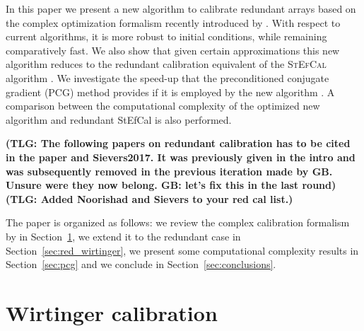 \documentclass[useAMS,usenatbib]{mn2e}
\begin{document}
In this paper we present a new algorithm to calibrate redundant arrays based on the complex optimization formalism recently introduced by \cite{Smirnov2015}. 
With respect to current algorithms, it is more robust to initial conditions, while remaining comparatively fast. We also show that given certain approximations this new algorithm reduces to the redundant calibration equivalent of the \textsc{StEfCal} algorithm \citep{Salvini2014}.
We investigate the speed-up that the preconditioned conjugate gradient (PCG) method provides if it is employed by the new algorithm \citep{Liu2010}.
A comparison between the computational complexity of the optimized new algorithm and redundant StEfCal is also performed.

{\bf (TLG: The following papers on redundant calibration has to be cited in the paper \citep{Noorishad2012} and Sievers2017. It was previously given in the 
intro and was subsequently removed in the previous iteration made by GB. Unsure were they now belong. GB: let's fix this in the last round)}
{\bf (TLG: Added Noorishad and Sievers to your red cal list.)}

The paper is organized as follows: we review the complex calibration formalism by \citet{Smirnov2015} in Section~\ref{sec:sky_wirtinger}, we extend it to the redundant case in Section~\ref{sec:red_wirtinger}, we present some computational complexity results in Section~\ref{sec:pcg} and we conclude in Section~\ref{sec:conclusions}.

\section{Wirtinger calibration}
\label{sec:sky_wirtinger}
\end{document}
